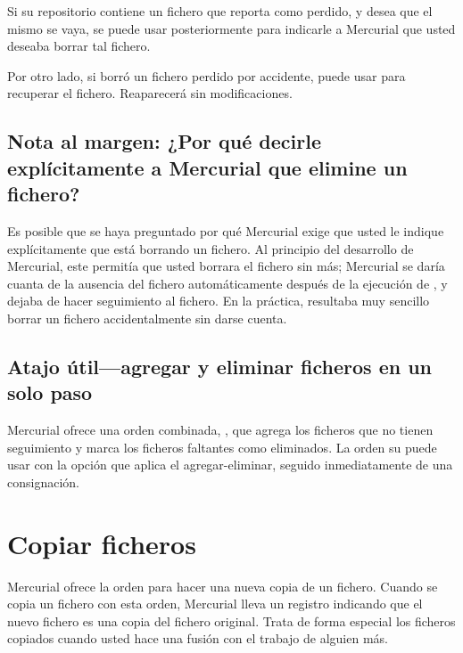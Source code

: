 Si su repositorio contiene un fichero que  reporta como
perdido, y desea que el mismo se vaya, se puede usar 
 posteriormente para
indicarle a Mercurial que usted deseaba borrar tal fichero.

Por otro lado, si borró un fichero perdido por accidente, puede usar
 para recuperar el
fichero. Reaparecerá sin modificaciones.

\subsection{Nota al margen: ¿Por qué decirle explícitamente a Mercurial
  que elimine un fichero?}

Es posible que se haya preguntado por qué Mercurial exige que usted le
indique explícitamente que está borrando un fichero. Al principio del
desarrollo de Mercurial, este permitía que usted borrara el fichero
sin más; Mercurial se daría cuanta de la ausencia del fichero
automáticamente después de la ejecución de , y dejaba de
hacer seguimiento al fichero.  En la práctica, resultaba muy sencillo
borrar un fichero accidentalmente sin darse cuenta.

\subsection{Atajo útil---agregar y eliminar ficheros en un solo paso}

Mercurial ofrece una orden combinada, , que agrega
los ficheros que no tienen seguimiento y marca los ficheros faltantes
como eliminados.
La orden  su puede usar con la opción  
que aplica el agregar-eliminar, seguido inmediatamente de una
consignación.

\section{Copiar ficheros}

Mercurial ofrece la orden  para hacer una nueva copia de
un fichero.  Cuando se copia un fichero con esta orden, Mercurial
lleva un registro indicando que el nuevo fichero es una copia del
fichero original. Trata de forma especial los ficheros copiados cuando
usted hace una fusión con el trabajo de alguien más.

